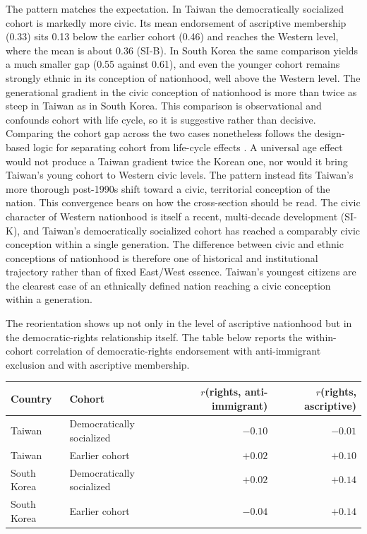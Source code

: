 The pattern matches the expectation. In Taiwan the democratically socialized cohort is markedly more civic. Its mean endorsement of ascriptive membership (0.33) sits 0.13 below the earlier cohort (0.46) and reaches the Western level, where the mean is about 0.36 (SI-B). In South Korea the same comparison yields a much smaller gap (0.55 against 0.61), and even the younger cohort remains strongly ethnic in its conception of nationhood, well above the Western level. The generational gradient in the civic conception of nationhood is more than twice as steep in Taiwan as in South Korea. This comparison is observational and confounds cohort with life cycle, so it is suggestive rather than decisive. Comparing the cohort gap across the two cases nonetheless follows the design-based logic for separating cohort from life-cycle effects \citep{dinas2014ageperiodcohort}. A universal age effect would not produce a Taiwan gradient twice the Korean one, nor would it bring Taiwan's young cohort to Western civic levels. The pattern instead fits Taiwan's more thorough post-1990s shift toward a civic, territorial conception of the nation. This convergence bears on how the cross-section should be read. The civic character of Western nationhood is itself a recent, multi-decade development (SI-K), and Taiwan's democratically socialized cohort has reached a comparably civic conception within a single generation. The difference between civic and ethnic conceptions of nationhood is therefore one of historical and institutional trajectory rather than of fixed East/West essence. Taiwan's youngest citizens are the clearest case of an ethnically defined nation reaching a civic conception within a generation.

The reorientation shows up not only in the level of ascriptive nationhood but in the democratic-rights relationship itself. The table below reports the within-cohort correlation of democratic-rights endorsement with anti-immigrant exclusion and with ascriptive membership.

\needspace{150pt}%
\begin{table}[H]
\centering
\small
\begin{tabular}{llrr}
\toprule
Country & Cohort & $r$(rights, anti-immigrant) & $r$(rights, ascriptive) \\
\midrule
Taiwan & Democratically socialized & $-0.10$ & $-0.01$ \\
Taiwan & Earlier cohort & $+0.02$ & $+0.10$ \\
South Korea & Democratically socialized & $+0.02$ & $+0.14$ \\
South Korea & Earlier cohort & $-0.04$ & $+0.14$ \\
\bottomrule
\end{tabular}
\end{table}

